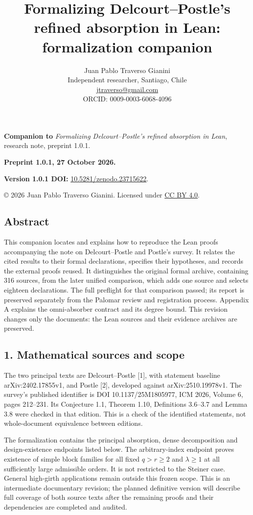 \documentclass[english,11pt,a4paper]{article}
\title{Formalizing Delcourt–Postle’s refined absorption in Lean: formalization companion}
\author{Juan Pablo Traverso Gianini\\
\small Independent researcher, Santiago, Chile\\
\small \href{mailto:jtraverso@gmail.com}{jtraverso@gmail.com}\\
\small ORCID: 0009-0003-6068-4096}
\date{}
\begin{document}
\raggedbottom
{}
\makeatletter
{}
\makeatother
\maketitle
\textbf{Companion to} \emph{Formalizing Delcourt--Postle's refined absorption in Lean}, research note, preprint 1.0.1.

\textbf{Preprint 1.0.1, 27 October 2026.}

\textbf{Version 1.0.1 DOI:} \href{https://doi.org/10.5281/zenodo.23715622}{10.5281/zenodo.23715622}.

© 2026 Juan Pablo Traverso Gianini. Licensed under \href{https://creativecommons.org/licenses/by/4.0/}{CC BY 4.0}.

\subsection{Abstract}\label{abstract}

This companion locates and explains how to reproduce the Lean proofs accompanying the note on Delcourt--Postle and Postle's survey. It relates the cited results to their formal declarations, specifies their hypotheses, and records the external proofs reused. It distinguishes the original formal archive, containing 316 sources, from the later unified comparison, which adds one source and selects eighteen declarations. The full preflight for that comparison passed; its report is preserved separately from the Palomar review and registration process. Appendix A explains the omni-absorber contract and its degree bound. This revision changes only the documents: the Lean sources and their evidence archives are preserved.

\subsection{1. Mathematical sources and scope}\label{mathematical-sources-and-scope}

The two principal texts are Delcourt--Postle {[}1{]}, with statement baseline arXiv:2402.17855v1, and Postle {[}2{]}, developed against arXiv:2510.19978v1. The survey's published identifier is DOI 10.1137/25M1805977, ICM 2026, Volume 6, pages 212--231. Its Conjecture 1.1, Theorem 1.10, Definitions 3.6--3.7 and Lemma 3.8 were checked in that edition. This is a check of the identified statements, not whole-document equivalence between editions.

The formalization contains the principal absorption, dense decomposition and design-existence endpoints listed below. The arbitrary-index endpoint proves existence of simple block families for all fixed \(q>r\ge2\) and \(\lambda\ge1\) at all sufficiently large admissible orders. It is not restricted to the Steiner case. General high-girth applications remain outside this frozen scope. This is an intermediate documentary revision; the planned definitive version will describe full coverage of both source texts after the remaining proofs and their dependencies are completed and audited.
\end{document}
